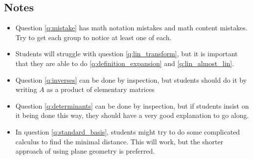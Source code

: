 \documentclass[red]{tutorial}
\theoremstyle{definition}
\theoremstyle{theorem}
\begin{document}
{\begin{instructions}
  \subsection*{Notes}
  \begin{itemize}
    \item
      Question \ref{q:mistake} has math notation mistakes and math content
      mistakes. Try to get each group to notice at least one of each.
    \item
      Students will struggle with question \ref{q:lin_transform}, but it is
      important that they are able to do \ref{q:definition_expansion} and
      \ref{q:lin_almost_lin}.
    \item
      Question \ref{q:inverses} can be done by inspection, but students should
      do it by writing $A$ as a product of elementary matrices
    \item
      Question \ref{q:determinants} can be done by inspection, but if students
      insist on it being done this way, they should have a very good
      explanation to go along.
    \item
      In question \ref{q:standard_basis}, students might try to do some
      complicated calculus to find the minimal distance. This will work, but
      the shorter approach of using plane geometry is preferred.
  \end{itemize}
\end{instructions}
}
\end{document}
